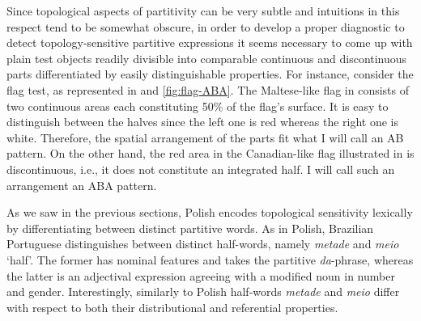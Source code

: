 Since topological aspects of partitivity can be very subtle and intuitions in this respect tend to be somewhat obscure, in order to develop a proper diagnostic to detect topology-sensitive partitive expressions it seems necessary to come up with plain test objects readily divisible into comparable continuous and discontinuous parts differentiated by easily distinguishable properties. For instance, consider the flag test, as represented in  and \ref{fig:flag-ABA}. The Maltese-like flag in  consists of two continuous areas each constituting 50\% of the flag's surface. It is easy to distinguish between the halves since the left one is red whereas the right one is white. Therefore, the spatial arrangement of the parts fit what I will call an AB pattern. On the other hand, the red area in the Canadian-like flag illustrated in  is discontinuous, i.e., it does not constitute an integrated half. I will call such an arrangement an ABA pattern.
		

\begin{figure}
\begin{floatrow}
        {}
        {}
\end{floatrow}
\end{figure}

As we saw in the previous sections, Polish encodes topological sensitivity lexically by differentiating between distinct partitive words. As in Polish, Brazilian Portuguese distinguishes between distinct half-words, namely \textit{metade} and \textit{meio} `half'. The former has nominal features and takes the partitive \textit{da}-phrase, whereas the latter is an adjectival expression agreeing with a modified noun in number and gender. Interestingly, similarly to Polish half-words \textit{metade} and \textit{meio} differ with respect to both their distributional and referential properties.\largerpage

